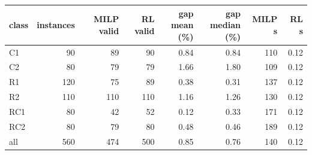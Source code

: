 \small
\begin{adjustbox}{max width=\linewidth}
\begin{tabular}{@{}lrrrrrrr@{}}
\toprule
class & instances & MILP valid & RL valid & \shortstack{gap mean\\(\%)} & \shortstack{gap median\\(\%)} & MILP s & RL s \\
\midrule
C1 & 90 & 89 & 90 & 0.84 & 0.84 & 110 & 0.12 \\
C2 & 80 & 79 & 79 & 1.66 & 1.80 & 109 & 0.12 \\
R1 & 120 & 75 & 89 & 0.38 & 0.31 & 137 & 0.12 \\
R2 & 110 & 110 & 110 & 1.16 & 1.26 & 130 & 0.12 \\
RC1 & 80 & 42 & 52 & 0.12 & 0.33 & 171 & 0.12 \\
RC2 & 80 & 79 & 80 & 0.48 & 0.46 & 189 & 0.12 \\
\midrule
all & 560 & 474 & 500 & 0.85 & 0.76 & 140 & 0.12 \\
\bottomrule
\end{tabular}
\end{adjustbox}
